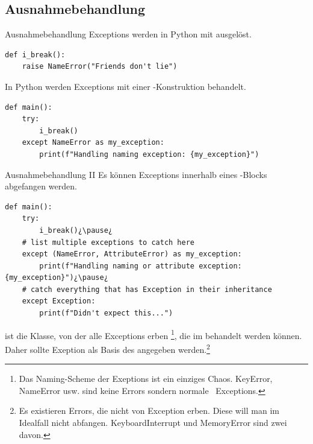\documentclass[12pt, aspectratio=169, usepdftitle=false]{beamer}
\newcommand{\pp}[1]{\lpl{#1}}
\begin{document}
\subsection{Ausnahmebehandlung}

\begin{frame}[fragile]{Ausnahmebehandlung}
  Exceptions werden in Python mit  ausgelöst. 
  \begin{lstlisting}[language=pytiny]
def i_break():
    raise NameError("Friends don't lie")
  \end{lstlisting}
  \pause

  In Python werden Exceptions mit einer -Konstruktion behandelt. 
  \begin{lstlisting}[language=pytiny]
def main():
    try:
        i_break()
    except NameError as my_exception:
        print(f"Handling naming exception: {my_exception}")
  \end{lstlisting}
\end{frame}
	


\begin{frame}[fragile]{Ausnahmebehandlung II}
	Es können  Exceptions innerhalb eines \pp{try}-Blocks abgefangen werden.
	\begin{lstlisting}[language=pytiny]
def main():
    try:
        i_break()¿\pause¿
    # list multiple exceptions to catch here 
    except (NameError, AttributeError) as my_exception:
        print(f"Handling naming or attribute exception: {my_exception}")¿\pause¿
    # catch everything that has Exception in their inheritance
    except Exception:
        print(f"Didn't expect this...")
	\end{lstlisting}
	\pause
	\pp{Exception} ist die Klasse, von der alle Exceptions erben
	\footnote{Das Naming-Scheme der Exeptions ist ein einziges Chaos. KeyError, NameError usw. sind keine Errors sondern \glqq normale\grqq~ Exceptions.}, die im  behandelt werden können.
	\newline\pause
	Daher sollte  Exeption als Basis des \pp{except} angegeben werden.\footnote{Es existieren Errors, die nicht von Exception erben. Diese will man im Idealfall nicht abfangen. KeyboardInterrupt und MemoryError sind zwei davon.}

\end{frame}
\end{document}
